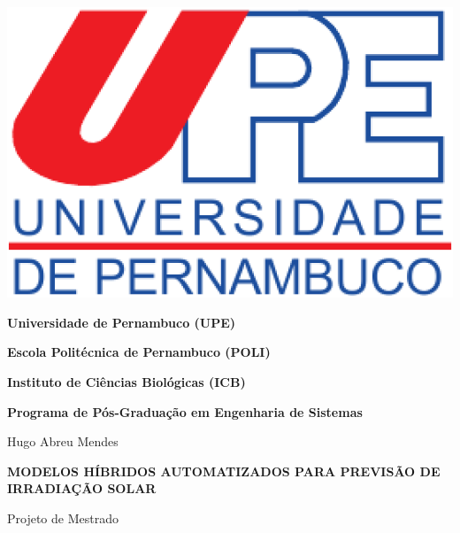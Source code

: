 \begin{center}
\begin{minipage}[b]{0.15\linewidth}
\end{minipage} \hfill
\begin{minipage}[b]{0.15\linewidth}
\includegraphics[width=\textwidth]{Figuras/Capa/upelogo.eps}
\end{minipage}


{\textbf{Universidade de Pernambuco (UPE)}} %

{\textbf{Escola Politécnica de Pernambuco (POLI)}} %

{\textbf{Instituto de Ciências Biológicas (ICB)}} \\ \vspace{1ex}

{\textbf{Programa de Pós-Graduação em Engenharia de Sistemas}} \\ \vspace{1ex}

\vspace{1.0in}

{\Large Hugo Abreu Mendes}

\vspace{1.3in}

{\Large \textbf{MODELOS HÍBRIDOS AUTOMATIZADOS PARA PREVISÃO DE IRRADIAÇÃO SOLAR}} \\

\vspace{1.4in}

{\large Projeto de Mestrado}

\vspace{1.6in}


\vspace{18pt}{Recife, Março de 2021.}

\end{center}